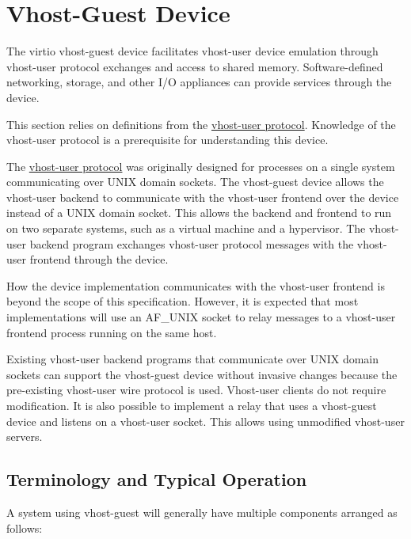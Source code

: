 \section{Vhost-Guest Device}\label{sec:Device Types / Vhost-Guest Device}

The virtio vhost-guest device facilitates vhost-user device
emulation through vhost-user protocol exchanges and access to
shared memory. Software-defined networking, storage, and other
I/O appliances can provide services through the device.

This section relies on definitions from the
\hyperref[intro:Vhost-user Protocol]{vhost-user protocol}.
Knowledge of the vhost-user protocol is a prerequisite for
understanding this device.

The \hyperref[intro:Vhost-user Protocol]{vhost-user protocol}
was originally designed for processes on a single system
communicating over UNIX domain sockets. The vhost-guest device
allows the vhost-user backend to communicate with the vhost-user
frontend over the device instead of a UNIX domain socket. This
allows the backend and frontend to run on two separate systems,
such as a virtual machine and a hypervisor. The vhost-user
backend program exchanges vhost-user protocol messages with the
vhost-user frontend through the device.

How the device implementation communicates with the vhost-user
frontend is beyond the scope of this specification. However,
it is expected that most implementations will use an AF_UNIX
socket to relay messages to a vhost-user frontend process
running on the same host.

Existing vhost-user backend programs that communicate over UNIX
domain sockets can support the vhost-guest device without
invasive changes because the pre-existing vhost-user wire
protocol is used. Vhost-user clients do not require modification.
It is also possible to implement a relay that uses a vhost-guest
device and listens on a vhost-user socket. This allows using
unmodified vhost-user servers.

\subsection{Terminology and Typical Operation}\label{sec:Device Types / Vhost-Guest Device / Terminology and Typical Operation}

A system using vhost-guest will generally have multiple
components arranged as follows:

